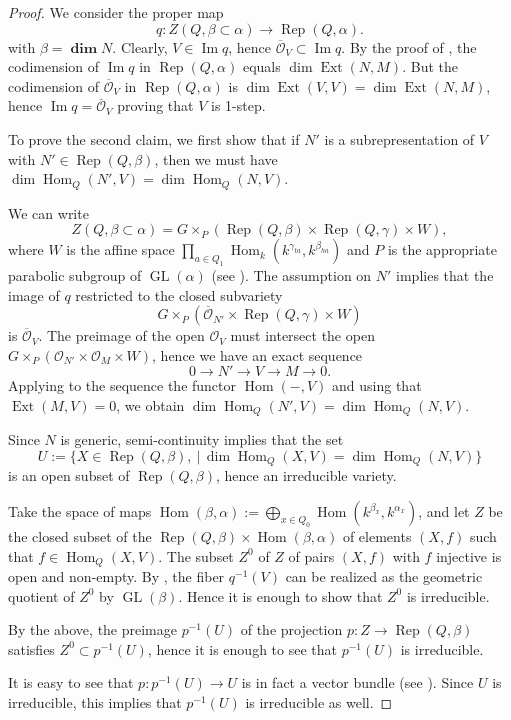 \documentclass[twoside]{article}
\newcommand{\orb}{\mathcal{O}}
\newcommand{\op}{\operatorname}
\DeclareMathOperator{\Dim}{\mathbf{dim}}
\newcommand{\Hom}{\operatorname{Hom}}
\newcommand{\Ext}{\operatorname{Ext}}
\newcommand{\GL}{\operatorname{GL}}
\newcommand{\Rep}{\operatorname{Rep}}
\theoremstyle{definition}
\begin{document}
\begin{proof}
We consider the proper map
$$q: Z(Q,\beta \subset \alpha) \to \Rep(Q,\alpha).$$
with  $\beta=\Dim N$. Clearly, $V\in \op{Im} q$, hence $\overline{\orb}_V \subset \op{Im} q$. By the proof of \cite[Theorem 3.3]{scho}, the codimension of $\op {Im} q$ in  $\Rep(Q,\alpha)$ equals $\dim \Ext(N,M)$. But the codimension of  $\overline{\orb}_V$ in  $\Rep(Q,\alpha)$ is $\dim \Ext(V,V)=\dim \Ext(N,M)$, hence  $ \op{Im} q=\overline{\orb}_V$ proving that $V$ is 1-step.

To prove the second claim, we first show that if  $N'$ is a subrepresentation of $V$ with $N'\in \Rep(Q,\beta)$, then we must have $\dim\Hom_Q(N',V)=\dim\Hom_Q(N,V)$.

We can write 
$$Z(Q,\beta \subset \alpha)= G\times_P (\Rep(Q,\beta) \times \Rep(Q,\gamma) \times W),$$
where $W$ is the affine space $\prod_{a\in Q_1}\Hom_k(k^{\gamma_{ta}}, k^{\beta_{ha}})$ and $P$ is the appropriate parabolic subgroup of $\GL(\alpha)$ (see \cite{scho}). The assumption on $N'$ implies that the image of $q$ restricted to the closed subvariety 
$$ G\times_P (\overline{\orb}_{N'} \times \Rep(Q,\gamma) \times W)$$ 
is $\overline{\orb}_V$. The preimage of the open $\orb_V$ must intersect the open  $G\times_P (\orb_{N'} \times \orb_M \times W)$, hence we have an exact sequence
$$0\to N' \to V \to M \to 0.$$
Applying to the sequence the functor $\Hom(-,V)$ and using that $\Ext(M,V)=0$, we obtain $\dim\Hom_Q(N',V)=\dim\Hom_Q(N,V)$.

Since $N$ is generic, semi-continuity implies that the set 
$$U:=\{X\in \Rep(Q,\beta),\ | \,\dim\Hom_Q(X,V)=\dim\Hom_Q(N,V)\}$$ 
is an open subset of $\Rep(Q,\beta)$, hence an irreducible variety.

Take the space of maps $\Hom(\beta,\alpha):= \bigoplus_{x\in Q_0} \Hom(k^{\beta_x},k^{\alpha_x})$, and let $Z$ be the closed subset of the $\Rep(Q,\beta)\times\Hom(\beta,\alpha)$ of elements $(X,f)$ such that $f\in \Hom_Q(X,V)$. The subset $Z^0$ of $Z$ of pairs $(X,f)$ with $f$ injective is open and non-empty. By \cite{quivgrass}, the fiber $q^{-1}(V)$ can be realized as the geometric quotient of $Z^0$ by $\GL(\beta)$. Hence it is enough to show that $Z^0$ is irreducible.

By the above, the preimage $p^{-1}(U)$ of the projection $p:Z \to \Rep(Q,\beta)$ satisfies $Z^0\subset  p^{-1}(U)$, hence it is enough to see that $p^{-1}(U)$ is irreducible.

It is easy to see that $p: p^{-1}(U)\to U$ is in fact a vector bundle (see \cite[Lemma 2.1]{bong}). Since $U$ is irreducible, this implies that $p^{-1}(U)$ is irreducible as well.
\end{proof}
\end{document}
